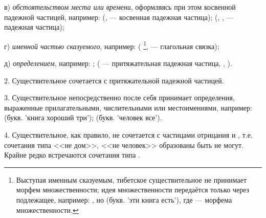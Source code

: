 в) \emph{обстоятельством места или времени}, оформляясь при этом косвенной падежной частицей, например:
 (, 
 --- косвенная падежная частица);
(, ,  --- падежная частица);

г) \emph{именной частью сказуемого}, например:
(
\footnote[26]{
Выступая именным сказуемым, тибетское существительное не принимает морфем множественности; идея множественности передаётся только через подлежащее, например: , но
(букв. 'эти книга есть'), где  --- морфема множественности.
},
 --- глагольная связка);

д) \emph{определением}, например:
;
( --- притяжательная падежная частица, ,
).

2. Существительное сочетается с притяжательной падежной частицей.

3. Существительное непосредственно после себя принимает определения, выраженные прилагательными, числительными или местоимениями, например:
 (букв. 'книга хороший три');
 (букв. 'человек все').

4. Существительное, как правило, не сочетается с частицами отрицания  и , т.е. сочетания типа <<не дом>>, <<не человек>> образованы быть не могут. Крайне редко встречаются сочетания типа	.